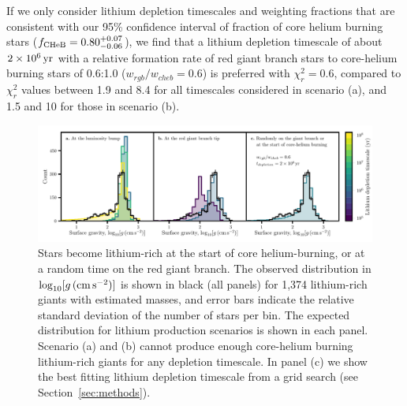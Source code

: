 \documentclass[twocolumn]{aastex62}
\newcommand{\logg}{\log_{10}[g\,({\rm cm\,s}^{-2})]}
\begin{document}
If we only consider lithium depletion timescales and weighting fractions that are consistent with our 95\% confidence interval of fraction of core helium burning stars ($f_{\rm CHeB} = 0.80^{+0.07}_{-0.06}$), we find that a lithium depletion timescale of about $2\times 10^{6}\,{\rm yr}$ with a relative formation rate of red giant branch stars to core-helium burning stars of 0.6:1.0 ($w_{rgb}/w_{cheb} = 0.6$) is preferred with $\chi_r^2 = 0.6$, compared to $\chi_r^2$ values between 1.9 and 8.4 for all timescales considered in scenario (a), and 1.5 and 10 for those in scenario (b).












 

\begin{figure}[t!]
	\includegraphics[width=\textwidth]{ref_timescales}
	\caption{{Stars become lithium-rich at the start of core helium-burning, or at a random time on the red giant branch.} The observed distribution in $\logg$ is shown in black (all panels) for 1,374 lithium-rich giants with estimated masses, and error bars indicate the relative standard deviation of the number of stars per bin. The expected distribution for lithium production scenarios is shown in each panel. Scenario (a) and (b) cannot produce enough core-helium burning lithium-rich giants for any depletion timescale. In panel (c) we show the best fitting lithium depletion timescale from a grid search (see Section~\ref{sec:methods}).}
	\label{fig:evtracks}
\end{figure}
\end{document}
